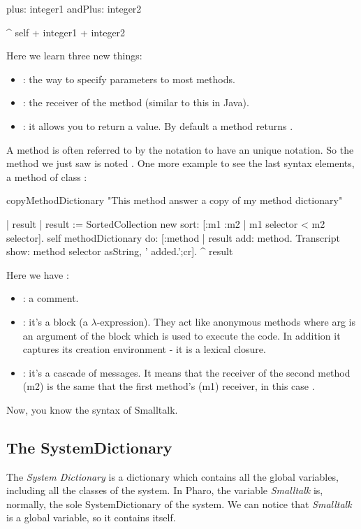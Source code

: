 \begin{code}{}
plus: integer1 andPlus: integer2 

\tab^ self + integer1 + integer2
\end{code}
Here we learn three new things:
\begin{itemize}
	\item {} : the way to specify parameters to most methods.
	\item {} : the receiver of the method (similar to this in Java).
	\item {} : it allows you to return a value\footnotemark. By default a method returns .
\end{itemize}
A method is often referred to by the notation  to have an unique notation. So the method we just saw is noted . 
One more example to see the last syntax elements, a method of class :
\begin{code}{}
copyMethodDictionary
	   "This method answer a copy of my method dictionary"
	
	   | result |
	   result := SortedCollection new sort: [:m1 :m2 | m1 selector < m2 selector].
	   self methodDictionary do: [:method |
	       result add: method.
	       Transcript  show: method selector asString, ' added.';cr].
       ^ result
\end{code}
Here we have :
\begin{itemize}
	\item {} : a comment.
	\item {} : it's a block (a $\lambda$-expression). They act like anonymous methods where arg is an argument of the block which is used to execute the code. In addition it captures its creation environment - it is a lexical closure.
	\item {} : it's a cascade of messages. It means that the receiver of the second method (m2) is the same that the first method's (m1) receiver, in this case .
\end{itemize}

Now, you know the syntax of \gls{Smalltalk}.

\subsection{The SystemDictionary}

The \emph{System Dictionary} is a dictionary which contains all the global variables, including all the classes of the system. In \gls{Pharo}, the variable \emph{Smalltalk} is, normally, the sole SystemDictionary of the system. We can notice that \emph{Smalltalk} is a global variable, so it contains itself.

